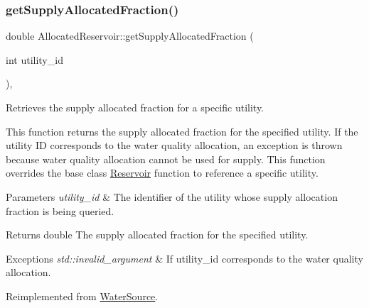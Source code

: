 \subsubsection{\texorpdfstring{get\+Supply\+Allocated\+Fraction()}{getSupplyAllocatedFraction()}}
{\footnotesize\ttfamily double Allocated\+Reservoir\+::get\+Supply\+Allocated\+Fraction (\begin{DoxyParamCaption}\item[{int}]{utility\+\_\+id }\end{DoxyParamCaption})\hspace{0.3cm}{\ttfamily [override]}, {\ttfamily [virtual]}}



Retrieves the supply allocated fraction for a specific utility. 

This function returns the supply allocated fraction for the specified utility. If the utility ID corresponds to the water quality allocation, an exception is thrown because water quality allocation cannot be used for supply. This function overrides the base class {\ttfamily \mbox{\hyperlink{classReservoir}{Reservoir}}} function to reference a specific utility.


\begin{DoxyParams}{Parameters}
{\em utility\+\_\+id} & The identifier of the utility whose supply allocation fraction is being queried.\\
\hline
\end{DoxyParams}
\begin{DoxyReturn}{Returns}
double The supply allocated fraction for the specified utility.
\end{DoxyReturn}

\begin{DoxyExceptions}{Exceptions}
{\em std\+::invalid\+\_\+argument} & If {\ttfamily utility\+\_\+id} corresponds to the water quality allocation. \\
\hline
\end{DoxyExceptions}


Reimplemented from \mbox{\hyperlink{classWaterSource_a484bca192a9e3aacaad47db0afb8fbdd}{Water\+Source}}.

\mbox{\label{classAllocatedReservoir_a9d025365aa42dfff13a0aac8ea7863fa}} 
